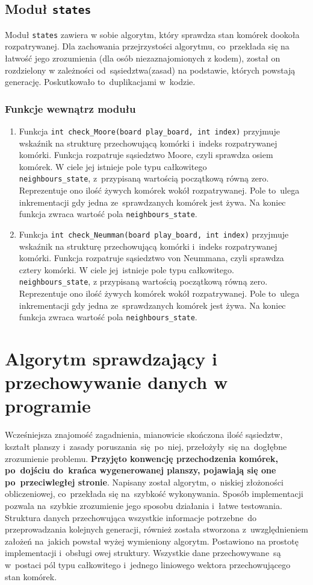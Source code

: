 \documentclass[a4paper,11pt]{article}
\begin{document}
	    \subsection{Moduł \texttt{states}}
	    	Moduł \texttt{states} zawiera w sobie algorytm, który sprawdza stan komórek dookoła rozpatrywanej. Dla zachowania przejrzystości algorytmu, co~przekłada się na łatwość jego zrozumienia (dla osób niezaznajomionych z kodem), został on rozdzielony w zależności od~sąsiedztwa(zasad) na podstawie, których powstają generację. Poskutkowało to~duplikacjami w~kodzie.
	    	\subsubsection{Funkcje wewnątrz modułu}
	    		\begin{enumerate}
	    			\item Funkcja \texttt{int check\_Moore(board play\_board, int index)} przyjmuje wskaźnik na strukturę przechowującą komórki i~indeks rozpatrywanej komórki. Funkcja rozpatruje sąsiedztwo Moore, czyli sprawdza osiem komórek. W ciele jej istnieje pole typu całkowitego \\ \texttt{neighbours\_state},
	    			z~przypisaną wartością początkową równą zero. Reprezentuje ono ilość żywych komórek wokół rozpatrywanej. Pole to~ulega inkrementacji gdy jedna ze~sprawdzanych komórek jest żywa. Na koniec funkcja zwraca wartość pola \texttt{neighbours\_state}.
	    			\item Funkcja \texttt{int check\_Neumman(board play\_board, int index)} przyjmuje wskaźnik na strukturę przechowującą komórki i~indeks rozpatrywanej komórki. Funkcja rozpatruje sąsiedztwo von Neummana, czyli sprawdza cztery komórki. W ciele jej~istnieje pole typu całkowitego. \texttt{neighbours\_state}, z przypisaną wartością początkową równą zero. Reprezentuje ono ilość żywych komórek wokół rozpatrywanej. Pole to~ulega inkrementacji gdy jedna ze~sprawdzanych komórek jest żywa. Na koniec funkcja zwraca wartość pola \texttt{neighbours\_state}.
	    		\end{enumerate}
    	\section{Algorytm sprawdzający i przechowywanie danych w programie}
    	Wcześniejsza znajomość zagadnienia, mianowicie skończona ilość sąsiedztw, kształt planszy i~zasady poruszania~się~po~niej, przełożyły~się na~dogłębne zrozumienie problemu. \textbf{Przyjęto konwencję przechodzenia komórek, po~dojściu do~krańca wygenerowanej planszy, pojawiają się one po~przeciwległej stronie}. Napisany został algorytm, o~niskiej złożoności obliczeniowej, co~przekłada się na~szybkość wykonywania. Sposób implementacji pozwala na~szybkie zrozumienie jego sposobu działania i~łatwe testowania. Struktura danych przechowująca wszystkie informacje potrzebne~do przeprowadzania kolejnych generacji, również została stworzona z~uwzględnieniem założeń na~jakich powstał wyżej wymieniony algorytm. Postawiono na prostotę implementacji i~obsługi owej struktury. Wszystkie dane przechowywane~są w~postaci pól typu całkowitego i~jednego liniowego wektora przechowującego stan komórek. 
\end{document}
